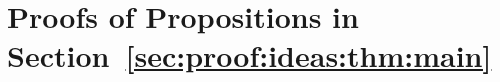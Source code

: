 \documentclass[11pt,a4paper]{article}
\begin{document}



\section{Proofs of Propositions in Section~\ref{sec:proof:ideas:thm:main}}
\label{sec:proof:props}

\end{document}
